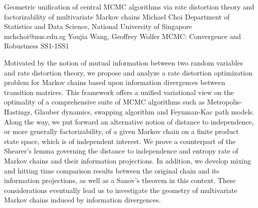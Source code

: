 \begin{talk}
  {Geometric unification of central MCMC algorithms via rate distortion theory and factorizability of multivariate Markov chains}%
  {Michael Choi}%
  {Department of Statistics and Data Science, National University of Singapore}%
  {mchchoi@nus.edu.sg}%
  {Youjia Wang, Geoffrey Wolfer}%
{MCMC: Convergence and Robustness}
{}{SS1-1}{SS1}


Motivated by the notion of mutual information between two random variables and rate distortion theory, we propose and analyze a rate distortion optimization problem for Markov chains based upon information divergences between transition matrices. This framework offers a unified variational view on the optimality of a comprehensive suite of MCMC algorithms such as Metropolis-Hastings, Glauber dynamics, swapping algorithm and Feynman-Kac path models. Along the way, we put forward an alternative notion of distance to independence, or more generally factorizability, of a given Markov chain on a finite product state space, which is of independent interest. We prove a counterpart of the Shearer's lemma governing the distance to independence and entropy rate of Markov chains and their information projections. In addition, we develop mixing and hitting time comparison results between the original chain and its information projections, as well as a Sanov's theorem in this context. These considerations eventually lead us to investigate the geometry of multivariate Markov chains induced by information divergences.
\end{talk}

